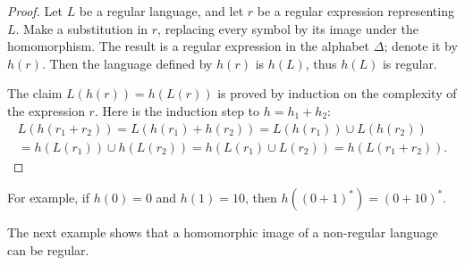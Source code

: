 

\setcounter{section}{3}
\setcounter{subsection}{3}
\setcounter{dfn}{12}

\begin{proof}
Let $L$ be a regular language, and let $r$ be a regular expression representing $L$.
Make a substitution in $r$, replacing every symbol by its image under the homomorphism.
The result is a regular expression in the alphabet $\Delta$; denote it by $h(r)$.
Then the language defined by $h(r)$ is $h(L)$, thus $h(L)$ is regular.

The claim $L(h(r)) = h(L(r))$ is proved by induction on the complexity of the expression $r$.
Here is the induction step to $h = h_1 + h_2$:
\begin{multline*}
L(h(r_1+r_2)) = L(h(r_1)+h(r_2)) = L(h(r_1)) \cup L(h(r_2))\\
= h(L(r_1)) \cup h(L(r_2)) = h(L(r_1) \cup L(r_2)) = h(L(r_1+r_2)).
\end{multline*}
\end{proof}

For example, if $h(0) = 0$ and $h(1) = 10$, then $h((0+1)^*) = (0+10)^*$.

The next example shows that a homomorphic image of a non-regular language can be regular.


